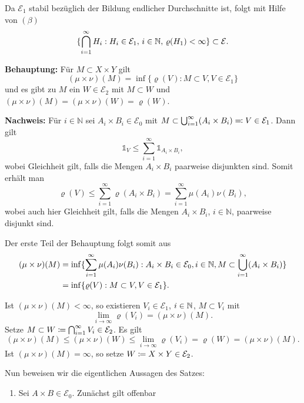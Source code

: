 \documentclass[a4paper,twoside,DIV15,BCOR12mm]{scrbook}
\newcommand{\ind}{\mathds 1}
\begin{document}
\begin{beweis}
Da $\mathcal{E}_1$ stabil bezüglich der Bildung endlicher Durchschnitte ist, folgt mit Hilfe von $(\beta)$
\[
\{\bigcap_{i=1}^\infty H_i : H_i\in\mathcal E_1,\, i\in\mathbb{N},\, \varrho(H_1)<\infty\} \subset \mathcal E.
\]

\textbf{Behauptung:} Für $M\subset X\times Y$ gilt 
\[
(\mu\times\nu)(M) = \inf\{\varrho(V):M\subset V, V\in \mathcal E_1\}
\]
und es gibt zu $M$ ein $W\in\mathcal E_2$ mit $M\subset W$ und $(\mu\times\nu)(M) = (\mu\times\nu)(W) = \varrho (W)$.

\textbf{Nachweis:} Für $i\in\mathbb{N}$ sei $A_i\times B_i  \in \mathcal E_0$ mit $M\subset \bigcup_{i=1}^\infty (A_i\times B_i)\ad V \in\mathcal E_1$. Dann gilt 
$$\ind_V \le \sum_{i=1}^\infty \ind_{A_i\times B_i},
$$ 
wobei Gleichheit gilt, falls die Mengen $A_i\times B_i$ paarweise disjunkten sind. Somit erhält man 
$$\varrho(V) \le \sum_{i=1}^\infty \varrho(A_i\times B_i) = \sum_{i=1}^\infty \mu(A_i) \nu(B_i),
$$ 
wobei auch hier Gleichheit gilt, falls die Mengen $A_i\times B_i$, $i\in\mathbb{N}$, paarweise disjunkt sind.

Der erste Teil der Behauptung folgt somit aus
\begin{align*}
(\mu\times\nu)(M) &= \inf\{\sum_{i=1}^\infty \mu(A_i)\nu(B_i) : A_i\times B_i \in \mathcal E_0, i\in\mathbb{N}, M\subset\bigcup_{i=1}^\infty(A_i\times B_i)\} \\
&= \inf\{\varrho(V): M\subset V, V\in\mathcal E_1\}.
\end{align*}

Ist $(\mu\times \nu)(M)<\infty$, so existieren $V_i\in\mathcal E_1$, $i\in\mathbb{N}$, $M\subset V_i$ mit
\[
\lim_{i\to\infty} \varrho(V_i) = (\mu\times\nu)(M).
\]
Setze $M\subset W \da \bigcap_{i=1}^\infty V_i \in\mathcal E_2$. Es gilt
\[
(\mu\times\nu)(M) \le (\mu\times \nu)(W) \le \lim_{i\to\infty}\varrho(V_i) = \varrho(W) = (\mu\times\nu)(M).
\]
Ist $(\mu\times\nu)(M) =\infty$, so setze $W\da X\times Y\in\mathcal E_2$.

Nun beweisen wir die eigentlichen Aussagen des Satzes:
\begin{enumerate}
\item Sei $A\times B\in\mathcal E_0$. Zunächst gilt offenbar


\end{enumerate}
\end{beweis}
\end{document}
